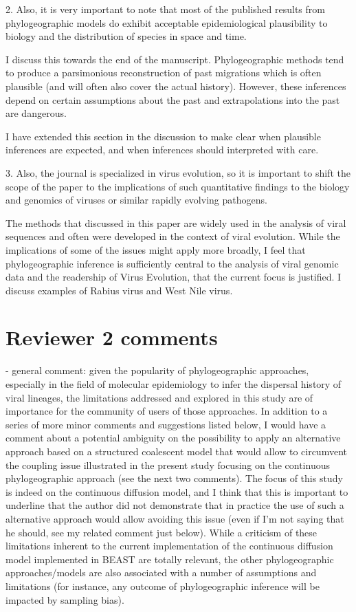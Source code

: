 \documentclass[11pt, oneside]{article}   	%
\newcommand{\response}[1]{{\color{black}{\bf Response:} #1}}
\begin{document}
2. Also, it is very important to note that most of the published results from phylogeographic models do exhibit acceptable epidemiological plausibility to biology and the distribution of species in space and time.

\response{I discuss this towards the end of the manuscript. Phylogeographic methods tend to produce a parsimonious reconstruction of past migrations which is often plausible (and will often also cover the actual history). However, these inferences depend on certain assumptions about the past and extrapolations into the past are dangerous.

I have extended this section in the discussion to make clear when plausible inferences are expected, and when inferences should interpreted with care.
}

3. Also, the journal is specialized in virus evolution, so it is important to shift the scope of the paper to the implications of such quantitative findings to the biology and genomics of viruses or similar rapidly evolving pathogens.

\response{The methods that discussed in this paper are widely used in the analysis of viral sequences and often were developed in the context of viral evolution. While the implications of some of the issues might apply more broadly, I feel that phylogeographic inference is sufficiently central to the analysis of viral genomic data and the readership of Virus Evolution, that the current focus is justified.
I discuss examples of Rabius virus and West Nile virus. }


\section*{Reviewer 2 comments}
- general comment: given the popularity of phylogeographic approaches, especially in the field of molecular epidemiology to infer the dispersal history of viral lineages, the limitations addressed and explored in this study are of importance for the community of users of those approaches. In addition to a series of more minor comments and suggestions listed below, I would have a comment about a potential ambiguity on the possibility to apply an alternative approach based on a structured coalescent model that would allow to circumvent the coupling issue illustrated in the present study focusing on the continuous phylogeographic approach (see the next two comments). The focus of this study is indeed on the continuous diffusion model, and I think that this is important to underline that the author did not demonstrate that in practice the use of such a alternative approach would allow avoiding this issue (even if I'm not saying that he should, see my related comment just below). While a criticism of these limitations inherent to the current implementation of the continuous diffusion model implemented in BEAST are totally relevant, the other phylogeographic approaches/models are also associated with a number of assumptions and limitations (for instance, any outcome of phylogeographic inference will be impacted by sampling bias).
\end{document}
